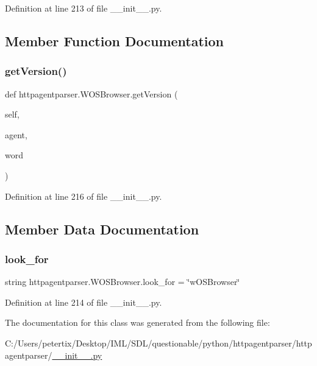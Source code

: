 Definition at line 213 of file \+\_\+\+\_\+init\+\_\+\+\_\+.\+py.



\subsection{Member Function Documentation}
\hypertarget{classhttpagentparser_1_1_w_o_s_browser_a42dc078f92222cb3d7d578b623638599}{}\label{classhttpagentparser_1_1_w_o_s_browser_a42dc078f92222cb3d7d578b623638599} 
\subsubsection{\texorpdfstring{get\+Version()}{getVersion()}}
{\footnotesize\ttfamily def httpagentparser.\+W\+O\+S\+Browser.\+get\+Version (\begin{DoxyParamCaption}\item[{}]{self,  }\item[{}]{agent,  }\item[{}]{word }\end{DoxyParamCaption})}



Definition at line 216 of file \+\_\+\+\_\+init\+\_\+\+\_\+.\+py.



\subsection{Member Data Documentation}
\hypertarget{classhttpagentparser_1_1_w_o_s_browser_a7975440f87d3d3b3228d979f7d47267a}{}\label{classhttpagentparser_1_1_w_o_s_browser_a7975440f87d3d3b3228d979f7d47267a} 
\subsubsection{\texorpdfstring{look\+\_\+for}{look\_for}}
{\footnotesize\ttfamily string httpagentparser.\+W\+O\+S\+Browser.\+look\+\_\+for = \char`\"{}w\+O\+S\+Browser\char`\"{}\hspace{0.3cm}{\ttfamily [static]}}



Definition at line 214 of file \+\_\+\+\_\+init\+\_\+\+\_\+.\+py.



The documentation for this class was generated from the following file\+:\begin{DoxyCompactItemize}
\item 
C\+:/\+Users/petertix/\+Desktop/\+I\+M\+L/\+S\+D\+L/questionable/python/httpagentparser/httpagentparser/\hyperlink{____init_____8py}{\+\_\+\+\_\+init\+\_\+\+\_\+.\+py}\end{DoxyCompactItemize}
